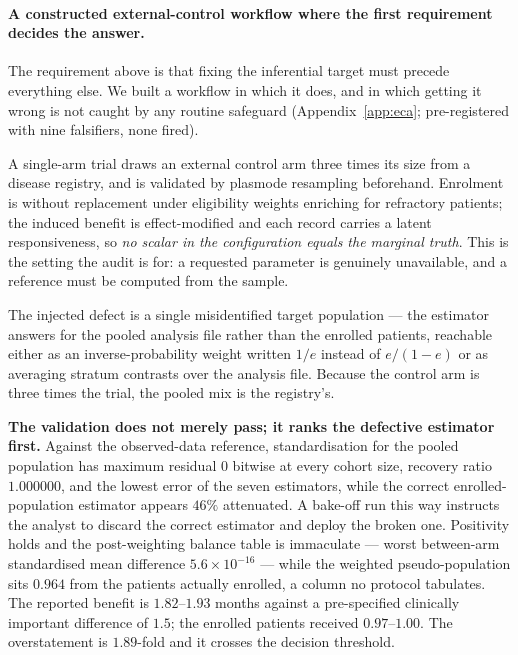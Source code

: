 \paragraph{A constructed external-control workflow where the first requirement
decides the answer.} The requirement above is that fixing the inferential
target must precede everything else. We built a workflow in which it does, and
in which getting it wrong is not caught by any routine safeguard
(Appendix~\ref{app:eca}; pre-registered with nine falsifiers, none fired).

A single-arm trial draws an external control arm three times its size from a
disease registry, and is validated by plasmode resampling beforehand.
Enrolment is without replacement under eligibility weights enriching for
refractory patients; the induced benefit is effect-modified and each record
carries a latent responsiveness, so \emph{no scalar in the configuration equals
the marginal truth}. This is the setting the audit is for: a requested
parameter is genuinely unavailable, and a reference must be computed from the
sample.

The injected defect is a single misidentified target population --- the
estimator answers for the pooled analysis file rather than the enrolled
patients, reachable either as an inverse-probability weight written $1/e$
instead of $e/(1-e)$ or as averaging stratum contrasts over the analysis file.
Because the control arm is three times the trial, the pooled mix is the
registry's.

\textbf{The validation does not merely pass; it ranks the defective estimator
first.} Against the observed-data reference, standardisation for the pooled
population has maximum residual $0$ bitwise at every cohort size, recovery
ratio $1.000000$, and the lowest error of the seven estimators, while the
correct enrolled-population estimator appears $46\%$ attenuated. A bake-off
run this way instructs the analyst to discard the correct estimator and deploy
the broken one. Positivity holds and the post-weighting balance table is
immaculate --- worst between-arm standardised mean difference
$5.6\times10^{-16}$ --- while the weighted pseudo-population sits $0.964$ from
the patients actually enrolled, a column no protocol tabulates. The reported
benefit is $1.82$--$1.93$ months against a pre-specified clinically important
difference of $1.5$; the enrolled patients received $0.97$--$1.00$. The
overstatement is $1.89$-fold and it crosses the decision threshold.

